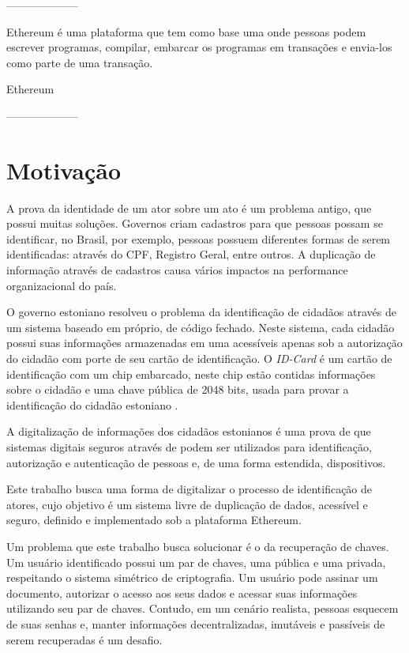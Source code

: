 \documentclass[tcc,capa]{texufpel}
\begin{document}
	--------------------
	
	Ethereum é uma plataforma que tem como base uma \bchain onde pessoas podem escrever programas, compilar, embarcar os  programas em transações e envia-los como parte de uma transação.
	
	Ethereum 
	
	
	--------------------
	
\section{Motivação}\label{sc:motivacao}

    A prova da identidade de um ator sobre um ato é um problema antigo, que possui muitas soluções. Governos criam cadastros para que pessoas possam se identificar, no Brasil, por exemplo, pessoas possuem diferentes formas de serem identificadas: através do CPF, Registro Geral, entre outros. A duplicação de informação através de cadastros causa vários impactos na performance organizacional do país.
    
    O governo estoniano resolveu o problema da identificação de cidadãos através de um sistema baseado em \bchain próprio, de código fechado. Neste sistema, cada cidadão possui suas informações armazenadas em uma \bchain acessíveis apenas sob a autorização do cidadão com porte de seu cartão de identificação. O \textit{ID-Card} é um cartão de identificação com um chip embarcado, neste chip estão contidas informações sobre o cidadão e uma chave pública de 2048 bits, usada para provar a identificação do cidadão estoniano \cite{eidentity}.
    
    A digitalização de informações dos cidadãos estonianos é uma prova de que sistemas digitais seguros através de \bchain podem ser utilizados para identificação, autorização e autenticação de pessoas e, de uma forma estendida, dispositivos.
    
    Este trabalho busca uma forma de digitalizar o processo de identificação de atores, cujo objetivo é um sistema livre de duplicação de dados, acessível e seguro, definido e implementado sob a plataforma Ethereum.
    
    Um problema que este trabalho busca solucionar é o da recuperação de chaves. Um usuário identificado possui um par de chaves, uma pública e uma privada, respeitando o sistema simétrico de criptografia. Um usuário pode assinar um documento, autorizar o acesso aos seus dados e acessar suas informações utilizando seu par de chaves. Contudo, em um cenário realista, pessoas esquecem de suas senhas e, manter informações decentralizadas, imutáveis e passíveis de serem recuperadas é um desafio.
	
\end{document}
